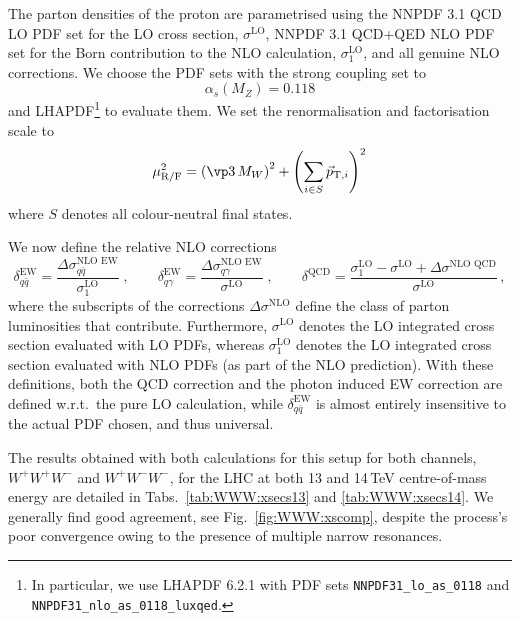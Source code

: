The parton densities of the proton are parametrised using the 
NNPDF 3.1 QCD LO PDF set \cite{Ball:2017nwa} for the LO cross 
section, $\sigma^\text{LO}$, NNPDF 3.1 QCD+QED NLO PDF set 
\cite{Bertone:2017bme} for the Born contribution to the 
NLO calculation, $\sigma_1^\text{LO}$, and all genuine NLO 
corrections. 
We choose the PDF sets with the strong coupling set to
\begin{equation}
  \alpha_s(M_Z)=0.118\nonumber
\end{equation}
and \textsc{LHAPDF}\footnote{
  In particular, we use \textsc{LHAPDF} 6.2.1 with PDF sets 
  \texttt{NNPDF31\_lo\_as\_0118} and 
  \texttt{NNPDF31\_nlo\_as\_0118\_luxqed}.
} to evaluate them.
We set the renormalisation and factorisation scale to 
\begin{equation}
  \mu_\text{R/F}^2=\left(\vp3\,M_W\right)^2+\left(\sum\limits_{i\in S}\vec{p}_{\mathrm{T},i}\right)^2
\end{equation}
where $S$ denotes all colour-neutral final states.

We now define the relative NLO corrections 
\begin{equation}
  \delta_{q\bar{q}}^\text{EW}
  =\frac{\Delta\sigma_{q\bar{q}}^\text{NLO EW}}{\sigma_1^\text{LO}}
  \;,\qquad
  \delta_{q\gamma}^\text{EW}
  =\frac{\Delta\sigma_{q\gamma}^\text{NLO EW}}{\sigma^\text{LO}}
  \;,\qquad
  \delta^\text{QCD}
  =\frac{\sigma_1^\text{LO}-\sigma^\text{LO}+\Delta\sigma^\text{NLO QCD}}{\sigma^\text{LO}}\,,
\end{equation}
where the subscripts of the corrections $\Delta \sigma^\text{NLO}$
define the class of parton luminosities
that contribute.
Furthermore, $\sigma^\text{LO}$ denotes the LO integrated cross
section evaluated with LO PDFs, whereas $\sigma_1^\text{LO}$ denotes
the LO integrated cross section evaluated with NLO PDFs (as part of
the NLO prediction).
With these definitions, both the QCD correction and the photon
induced EW correction are defined w.r.t.\ the pure LO calculation,
while $\delta_{q\bar{q}}^\text{EW}$ is almost
entirely insensitive to the actual PDF chosen, and thus 
universal.


The results obtained with both calculations for this setup 
for both channels, $W^+W^+W^-$ and $W^+W^-W^-$, for the LHC 
at both 13 and 14\,TeV centre-of-mass energy are detailed 
in Tabs.\ \ref{tab:WWW:xsecs13} and \ref{tab:WWW:xsecs14}. 
We generally find good agreement, see Fig.~\ref{fig:WWW:xscomp},
despite the process's poor convergence owing to the presence
of multiple narrow resonances.

